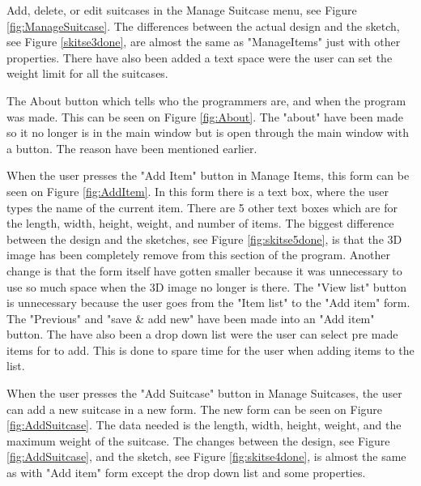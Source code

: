 Add, delete, or edit suitcases in the Manage Suitcase menu, see Figure \ref{fig:ManageSuitcase}. The differences between the actual design and the sketch, see Figure \ref{skitse3done}, are almost the same as "ManageItems" just with other properties. There have also been added a text space were the user can set the weight limit for all the suitcases.

The About button which tells who the programmers are, and when the program was made. This can be seen on Figure \ref{fig:About}. The "about" have been made so it no longer is in the main window but is open through the main window with a button. The reason have been mentioned earlier.

When the user presses the "Add Item" button in Manage Items, this form can be seen on Figure \ref{fig:AddItem}. In this form there is a text box, where the user types the name of the current item. There are 5 other text boxes which are for the length, width, height, weight, and number of items. The biggest difference between the design and the sketches, see Figure \ref{fig:skitse5done}, is that the 3D image has been completely remove from this section of the program. Another change is that the form itself have gotten smaller because it was unnecessary to use so much space when the 3D image no longer is there. The "View list" button is unnecessary because the user goes from the "Item list" to the "Add item" form. The "Previous" and "save \& add new" have been made into an "Add item" button. The have also been a drop down list were the user can select pre made items for to add. This is done to spare time for the user when adding items to the list.

When the user presses the "Add Suitcase" button in Manage Suitcases, the user can add a new suitcase in a new form. The new form can be seen on Figure \ref{fig:AddSuitcase}. The data needed is the length, width, height, weight, and the maximum weight of the suitcase. The changes between the design, see Figure \ref{fig:AddSuitcase}, and the sketch, see Figure \ref{fig:skitse4done}, is almost the same as with "Add item" form except the drop down list and some properties.

